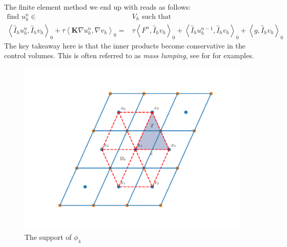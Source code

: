 \documentclass[../Main/main.tex]{subfiles}
\begin{document}
	The finite element method we end up with reads as follows:
	\begin{equation} \label{eq:modified_fem}
		\begin{aligned}
			\text{find }u_h^n\in&V_h \text{ such that}\\
			\left \langle \hat{I}_h u_h^n,\hat{I}_h v_h \right \rangle_0 + \tau  \left \langle \pmb{K} \nabla u_h^n,\nabla v_h \right \rangle_0 =&\tau \left \langle F^n,\hat{I}_h v_h \right \rangle_{0} + \left \langle \hat{I}_h u_h^{n-1},\hat{I}_h v_h\right \rangle_0 + \left \langle g,\hat{I}_h v_h \right \rangle_{0} 
		\end{aligned}
	\end{equation}
	The key takeaway here is that the inner products become conservative in the control volumes. This is often referred to as \emph{mass lumping}, see for \cite{baranger1996connection} for examples.  
	\par
		\begin{figure}[H]\label{fig:control volume}
		\centering
		\includegraphics[width=1\textwidth]{Control volume.pdf}
		\caption{The support of $\phi_4$}
	\end{figure}
\end{document}
